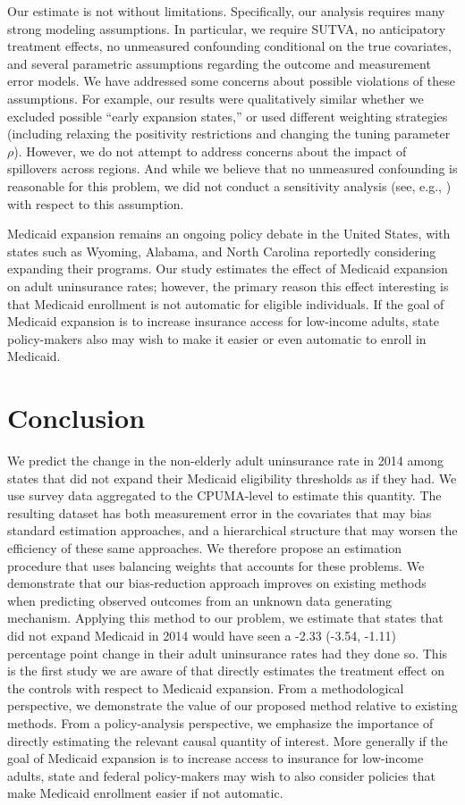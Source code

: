 \documentclass[aoas]{imsart}
\theoremstyle{plain}
\theoremstyle{remark}
\begin{document}
Our estimate is not without limitations. Specifically, our analysis requires many strong modeling assumptions. In particular, we require SUTVA, no anticipatory treatment effects, no unmeasured confounding conditional on the true covariates, and several parametric assumptions regarding the outcome and measurement error models. We have addressed some concerns about possible violations of these assumptions. For example, our results were qualitatively similar whether we excluded possible ``early expansion states,'' or used different weighting strategies (including relaxing the positivity restrictions and changing the tuning parameter $\rho$). However, we do not attempt to address concerns about the impact of spillovers across regions. And while we believe that no unmeasured confounding is reasonable for this problem, we did not conduct a sensitivity analysis (see, e.g., \cite{bonvini2021sensitivity}) with respect to this assumption. 

Medicaid expansion remains an ongoing policy debate in the United States, with states such as Wyoming, Alabama, and North Carolina reportedly considering expanding their programs. Our study estimates the effect of Medicaid expansion on adult uninsurance rates; however, the primary reason this effect interesting is that Medicaid enrollment is not automatic for eligible individuals. If the goal of Medicaid expansion is to increase insurance access for low-income adults, state policy-makers also may wish to make it easier or even automatic to enroll in Medicaid. 

\section{Conclusion}

We predict the change in the non-elderly adult uninsurance rate in 2014 among states that did not expand their Medicaid eligibility thresholds as if they had. We use survey data aggregated to the CPUMA-level to estimate this quantity. The resulting dataset has both measurement error in the covariates that may bias standard estimation approaches, and a hierarchical structure that may worsen the efficiency of these same approaches. We therefore propose an estimation procedure that uses balancing weights that accounts for these problems. We demonstrate that our bias-reduction approach improves on existing methods when predicting observed outcomes from an unknown data generating mechanism. Applying this method to our problem, we estimate that states that did not expand Medicaid in 2014 would have seen a -2.33 (-3.54, -1.11) percentage point change in their adult uninsurance rates had they done so. This is the first study we are aware of that directly estimates the treatment effect on the controls with respect to Medicaid expansion. From a methodological perspective, we demonstrate the value of our proposed method relative to existing methods. From a policy-analysis perspective, we emphasize the importance of directly estimating the relevant causal quantity of interest. More generally if the goal of Medicaid expansion is to increase access to insurance for low-income adults, state and federal policy-makers may wish to also consider policies that make Medicaid enrollment easier if not automatic.
\end{document}

